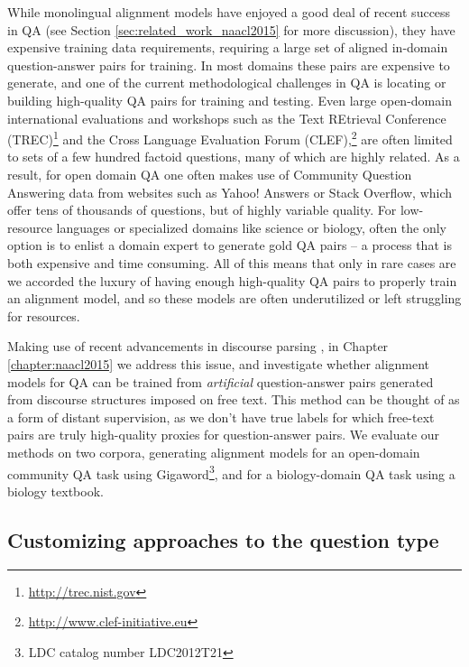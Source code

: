 While monolingual alignment models have enjoyed a good deal of recent success in QA (see Section \ref{sec:related_work_naacl2015} for more discussion), they have expensive training data requirements,  
requiring a large set of aligned in-domain question-answer pairs for training.
In most domains these pairs are expensive to generate, and one of the current methodological challenges in QA is locating or building high-quality QA pairs for training and testing. Even large open-domain international evaluations and workshops such as the Text REtrieval Conference (TREC)\footnote{\url{http://trec.nist.gov}} and the Cross Language Evaluation Forum (CLEF),\footnote{\url{http://www.clef-initiative.eu}} are often limited to sets of a few hundred factoid questions, many of which are highly related.  As a result, for open domain QA one often makes use of Community Question Answering data from websites such as Yahoo! Answers or Stack Overflow, which offer tens of thousands of questions, but of highly variable quality.  
For low-resource languages or specialized domains like science or biology, often the only option is to enlist a domain expert to generate gold QA pairs --  a process that is both expensive and time consuming.  All of this means that only in rare cases are we accorded the luxury of having enough high-quality QA pairs to properly train an alignment model, and so these models are often underutilized or left struggling for resources. 

Making use of recent advancements in discourse parsing \citep{feng12}, in Chapter \ref{chapter:naacl2015} we address this issue, and investigate whether alignment models for QA can be trained from \emph{artificial} question-answer pairs generated from discourse structures imposed on free text. This method can be thought of as a form of distant supervision, as we don't have true labels for which free-text pairs are truly high-quality proxies for question-answer pairs.
We evaluate our methods on two corpora, generating alignment models for an open-domain community QA task using Gigaword\footnote{LDC catalog number LDC2012T21}, and for a biology-domain QA task using a biology textbook. 


\subsection{Customizing approaches to the question type}
\label{sec:intro_emnlp2016}

